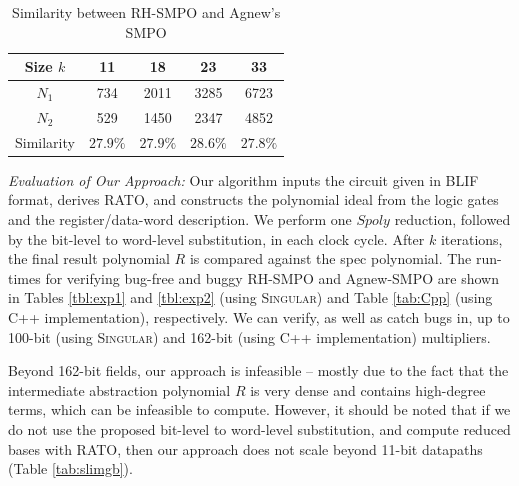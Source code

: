 \begin{table}[htb]
\centering
\caption{\small Similarity between RH-SMPO and Agnew's SMPO}
\label{tbl:fraig}
\begin{tabular}{|c||c|c|c|c|} 
\hline
Size $k$ & 11 & 18 & 23 & 33 \\
\hline
$N_1$ & 734  & 2011  & 3285  & 6723\\
\hline
$N_2$ & 529 & 1450 & 2347 & 4852\\
\hline
Similarity & $27.9\%$ & $27.9\%$ & $28.6\%$ & $27.8\%$  \\
\hline
\end{tabular}\label{table:similarity}  
\end{table} 

{\it Evaluation of Our Approach:} Our algorithm inputs the circuit
given in BLIF format, derives RATO, and constructs the polynomial
ideal from the logic gates and the register/data-word description.  We
perform one $Spoly$ reduction, followed by the bit-level to word-level 
substitution, in each clock cycle. After $k$ iterations, the final
result polynomial $R$ is compared against the spec polynomial. The
run-times for verifying bug-free and buggy RH-SMPO and Agnew-SMPO are
shown in Tables \ref{tbl:exp1} and \ref{tbl:exp2} (using \textsc{Singular})
and Table \ref{tab:Cpp} (using C++ implementation), respectively. 
We can verify, as well as catch bugs in, up to 100-bit (using \textsc{Singular})
and 162-bit (using C++ implementation) multipliers. 

Beyond 162-bit fields, our approach is infeasible --
mostly due to the fact that the intermediate 
abstraction polynomial $R$ is very dense and contains high-degree
terms, which can be infeasible to compute. However, it should be noted
that if we do not use the proposed bit-level to word-level
substitution, and compute reduced \Grobner bases with RATO, then our
approach does not scale beyond 11-bit datapaths (Table \ref{tab:slimgb}). 

